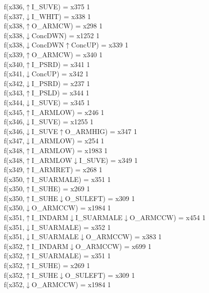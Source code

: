 f(x336,$\uparrow$I\_SUVE) = x375 {1} \\
f(x337,$\downarrow$I\_WHIT) = x338 {1} \\
f(x338,$\uparrow$O\_ARMCW) = x298 {1} \\
f(x338,$\downarrow$ConcDWN) = x1252 {1} \\
f(x338,$\downarrow$ConcDWN$\uparrow$ConcUP) = x339 {1} \\
f(x339,$\uparrow$O\_ARMCW) = x340 {1} \\
f(x340,$\uparrow$I\_PSRD) = x341 {1} \\
f(x341,$\downarrow$ConcUP) = x342 {1} \\
f(x342,$\downarrow$I\_PSRD) = x237 {1} \\
f(x343,$\uparrow$I\_PSLD) = x344 {1} \\
f(x344,$\downarrow$I\_SUVE) = x345 {1} \\
f(x345,$\uparrow$I\_ARMLOW) = x246 {1} \\
f(x346,$\downarrow$I\_SUVE) = x1255 {1} \\
f(x346,$\downarrow$I\_SUVE$\uparrow$O\_ARMHIG) = x347 {1} \\
f(x347,$\downarrow$I\_ARMLOW) = x254 {1} \\
f(x348,$\uparrow$I\_ARMLOW) = x1983 {1} \\
f(x348,$\uparrow$I\_ARMLOW$\downarrow$I\_SUVE) = x349 {1} \\
f(x349,$\uparrow$I\_ARMRET) = x268 {1} \\
f(x350,$\uparrow$I\_SUARMALE) = x351 {1} \\
f(x350,$\uparrow$I\_SUHE) = x269 {1} \\
f(x350,$\uparrow$I\_SUHE$\downarrow$O\_SULEFT) = x309 {1} \\
f(x350,$\downarrow$O\_ARMCCW) = x1984 {1} \\
f(x351,$\uparrow$I\_INDARM$\downarrow$I\_SUARMALE$\downarrow$O\_ARMCCW) = x454 {1} \\
f(x351,$\downarrow$I\_SUARMALE) = x352 {1} \\
f(x351,$\downarrow$I\_SUARMALE$\downarrow$O\_ARMCCW) = x383 {1} \\
f(x352,$\uparrow$I\_INDARM$\downarrow$O\_ARMCCW) = x699 {1} \\
f(x352,$\uparrow$I\_SUARMALE) = x351 {1} \\
f(x352,$\uparrow$I\_SUHE) = x269 {1} \\
f(x352,$\uparrow$I\_SUHE$\downarrow$O\_SULEFT) = x309 {1} \\
f(x352,$\downarrow$O\_ARMCCW) = x1984 {1} \\
